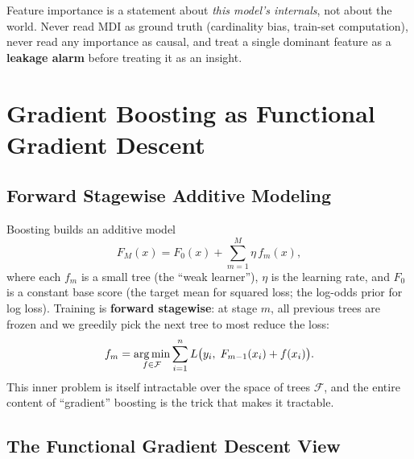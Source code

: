 \begin{warningbox}
Feature importance is a statement about \textit{this model's internals}, not about the world. Never read MDI as ground truth (cardinality bias, train-set computation), never read any importance as causal, and treat a single dominant feature as a \textbf{leakage alarm} before treating it as an insight.
\end{warningbox}

\section{Gradient Boosting as Functional Gradient Descent}
\label{cml:sec:boosting_theory}

\subsection{Forward Stagewise Additive Modeling}

Boosting builds an additive model
\begin{equation}
F_M(x) = F_0(x) + \sum_{m=1}^{M} \eta\, f_m(x),
\end{equation}
where each $f_m$ is a small tree (the ``weak learner''), $\eta$ is the learning rate, and $F_0$ is a constant base score (the target mean for squared loss; the log-odds prior for log loss). Training is \textbf{forward stagewise}: at stage $m$, all previous trees are frozen and we greedily pick the next tree to most reduce the loss:
\begin{equation}
f_m = \operatorname*{arg\,min}_{f \in \mathcal{F}} \sum_{i=1}^n L\big(y_i,\; F_{m-1}(x_i) + f(x_i)\big).
\end{equation}
This inner problem is itself intractable over the space of trees $\mathcal{F}$, and the entire content of ``gradient'' boosting is the trick that makes it tractable.

\subsection{The Functional Gradient Descent View}

